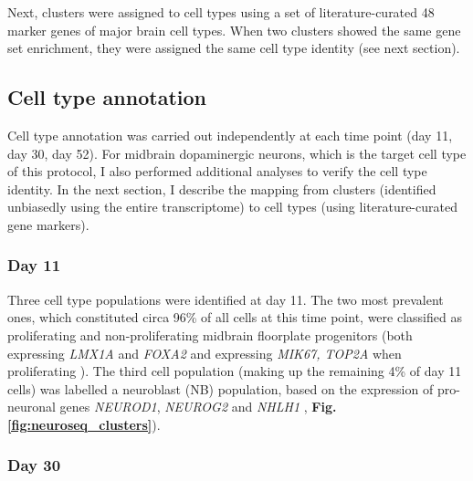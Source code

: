 Next, clusters were assigned to cell types using a set of literature-curated 48 marker genes of major brain cell types. 
When two clusters showed the same gene set enrichment, they were assigned the same cell type identity (see next section).

\subsection{Cell type annotation}
Cell type annotation was carried out independently at each time point (day 11, day 30, day 52).
For midbrain dopaminergic neurons, which is the target cell type of this protocol, I also performed additional analyses to verify the cell type identity.
In the next section, I describe the mapping from clusters (identified unbiasedly using the entire transcriptome) to cell types (using literature-curated gene markers).

\subsubsection{Day 11}

Three cell type populations were identified at day 11.
The two most prevalent ones, which constituted circa 96\% of all cells at this time point, were classified as proliferating and non-proliferating midbrain floorplate progenitors (both expressing \textit{LMX1A} and \textit{FOXA2} and expressing \textit{MIK67, TOP2A} when proliferating \cite{la2016molecular}).
The third cell population (making up the remaining 4\% of day 11 cells) was labelled a neuroblast (NB) population, based on the expression of pro-neuronal genes \textit{NEUROD1}, \textit{NEUROG2} and \textit{NHLH1} \cite{bertrand2002proneural, lacomme2012neurog2}, \textbf{Fig. \ref{fig:neuroseq_clusters}}).

\subsubsection{Day 30}

